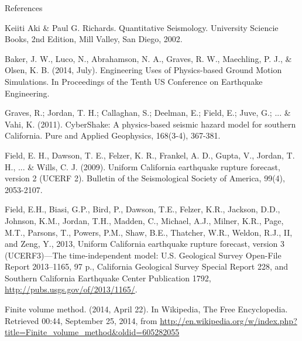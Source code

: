 \documentclass{beamer}
\begin{document}
%
%
\begin{frame}[allowframebreaks]{References}
\def\newblock{}
%
%

\begin{thebibliography}{1}

 Keiiti Aki \& Paul G. Richards. {Q}uantitative {S}eismology. University Sciencie Books, 2nd Edition, Mill Valley, San Diego, 2002.

 Baker, J. W., Luco, N., Abrahamson, N. A., Graves, R. W., Maechling, P. J., \& Olsen, K. B. (2014, July). Engineering Uses of Physics-based Ground Motion Simulations. In Proceedings of the Tenth US Conference on Earthquake Engineering.

 Graves, R.; Jordan, T. H.; Callaghan, S.; Deelman, E.; Field, E.; Juve, G.; ... \& Vahi, K. (2011). CyberShake: A physics-based seismic hazard model for southern California. Pure and Applied Geophysics, 168(3-4), 367-381.

 Field, E. H., Dawson, T. E., Felzer, K. R., Frankel, A. D., Gupta, V., Jordan, T. H., ... \& Wills, C. J. (2009). Uniform California earthquake rupture forecast, version 2 (UCERF 2). Bulletin of the Seismological Society of America, 99(4), 2053-2107.

 Field, E.H., Biasi, G.P., Bird, P., Dawson, T.E., Felzer, K.R., Jackson, D.D., Johnson, K.M., Jordan, T.H., Madden, C., Michael, A.J., Milner, K.R., Page, M.T., Parsons, T., Powers, P.M., Shaw, B.E., Thatcher, W.R., Weldon, R.J., II, and Zeng, Y., 2013, Uniform California earthquake rupture forecast, version 3 (UCERF3)—The time-independent model: U.S. Geological Survey Open-File Report 2013–1165, 97 p., California Geological Survey Special Report 228, and Southern California Earthquake Center Publication 1792, \url{http://pubs.usgs.gov/of/2013/1165/}.

 Finite volume method. (2014, April 22). In Wikipedia, The Free Encyclopedia. Retrieved 00:44, September 25, 2014, from \url{http://en.wikipedia.org/w/index.php?title=Finite_volume_method&oldid=605282055}

\end{thebibliography}

\end{frame}
\end{document}
